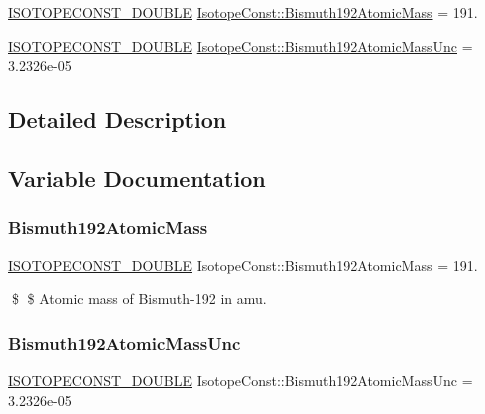 \begin{DoxyCompactItemize}
\item 
\mbox{\hyperlink{group___isotope_const-_macros_ga8f45a7272ce02c0b4c65c44636ed719a}{I\+S\+O\+T\+O\+P\+E\+C\+O\+N\+S\+T\+\_\+\+D\+O\+U\+B\+LE}} \mbox{\hyperlink{group___isotope_const-_bismuth-_bi192_ga285b25bbc2695781c0264ba14bb26743}{Isotope\+Const\+::\+Bismuth192\+Atomic\+Mass}} = 191.
\item 
\mbox{\hyperlink{group___isotope_const-_macros_ga8f45a7272ce02c0b4c65c44636ed719a}{I\+S\+O\+T\+O\+P\+E\+C\+O\+N\+S\+T\+\_\+\+D\+O\+U\+B\+LE}} \mbox{\hyperlink{group___isotope_const-_bismuth-_bi192_ga65766580d0f94032e4d4c721e3fdf3a0}{Isotope\+Const\+::\+Bismuth192\+Atomic\+Mass\+Unc}} = 3.\+2326e-\/05
\end{DoxyCompactItemize}


\subsection{Detailed Description}


\subsection{Variable Documentation}
\mbox{\label{group___isotope_const-_bismuth-_bi192_ga285b25bbc2695781c0264ba14bb26743}} 
\subsubsection{\texorpdfstring{Bismuth192\+Atomic\+Mass}{Bismuth192AtomicMass}}
{\footnotesize\ttfamily \mbox{\hyperlink{group___isotope_const-_macros_ga8f45a7272ce02c0b4c65c44636ed719a}{I\+S\+O\+T\+O\+P\+E\+C\+O\+N\+S\+T\+\_\+\+D\+O\+U\+B\+LE}} Isotope\+Const\+::\+Bismuth192\+Atomic\+Mass = 191.}

\$ \$ Atomic mass of Bismuth-\/192 in amu. \mbox{\label{group___isotope_const-_bismuth-_bi192_ga65766580d0f94032e4d4c721e3fdf3a0}} 
\subsubsection{\texorpdfstring{Bismuth192\+Atomic\+Mass\+Unc}{Bismuth192AtomicMassUnc}}
{\footnotesize\ttfamily \mbox{\hyperlink{group___isotope_const-_macros_ga8f45a7272ce02c0b4c65c44636ed719a}{I\+S\+O\+T\+O\+P\+E\+C\+O\+N\+S\+T\+\_\+\+D\+O\+U\+B\+LE}} Isotope\+Const\+::\+Bismuth192\+Atomic\+Mass\+Unc = 3.\+2326e-\/05}

